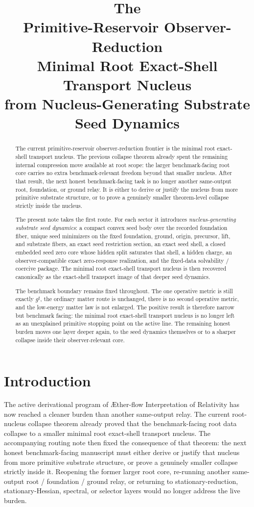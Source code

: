 \documentclass[11pt]{article}
\title{\textbf{The \TheoryName{}}\\[0.4em]
\large Primitive-Reservoir Observer-Reduction\\
\large Minimal Root Exact-Shell Transport Nucleus\\
\large from Nucleus-Generating Substrate Seed Dynamics}
\author{}
\date{}
\newcommand{\Aflow}{\AE{}ther-flow}
\newcommand{\TheoryName}{\Aflow{} Interpretation of Relativity}
\newcommand{\CompletedMetric}{g^{\sharp}}
\begin{document}
\maketitle

\begin{abstract}
The current primitive-reservoir observer-reduction frontier is the minimal root exact-shell transport nucleus. The previous collapse theorem already spent the remaining internal compression move available at root scope: the larger benchmark-facing root core carries no extra benchmark-relevant freedom beyond that smaller nucleus. After that result, the next honest benchmark-facing task is no longer another same-output root, foundation, or ground relay. It is either to derive or justify the nucleus from more primitive substrate structure, or to prove a genuinely smaller theorem-level collapse strictly inside the nucleus.

The present note takes the first route. For each sector it introduces \emph{nucleus-generating substrate seed dynamics}: a compact convex seed body over the recorded foundation fiber, unique seed minimizers on the fixed foundation, ground, origin, precursor, lift, and substrate fibers, an exact seed restriction section, an exact seed shell, a closed embedded seed zero core whose hidden split saturates that shell, a hidden charge, an observer-compatible exact zero-response realization, and the fixed-data solvability / coercive package. The minimal root exact-shell transport nucleus is then recovered canonically as the exact-shell transport image of that deeper seed dynamics.

The benchmark boundary remains fixed throughout. The one operative metric is still exactly \(\CompletedMetric\), the ordinary matter route is unchanged, there is no second operative metric, and the low-energy matter law is not enlarged. The positive result is therefore narrow but benchmark facing: the minimal root exact-shell transport nucleus is no longer left as an unexplained primitive stopping point on the active line. The remaining honest burden moves one layer deeper again, to the seed dynamics themselves or to a sharper collapse inside their observer-relevant core.
\end{abstract}

\section{Introduction}

The active derivational program of \TheoryName{} has now reached a cleaner burden than another same-output relay. The current root-nucleus collapse theorem already proved that the benchmark-facing root data collapse to a smaller minimal root exact-shell transport nucleus. The accompanying routing note then fixed the consequence of that theorem: the next honest benchmark-facing manuscript must either derive or justify that nucleus from more primitive substrate structure, or prove a genuinely smaller collapse strictly inside it. Reopening the former larger root core, re-running another same-output root / foundation / ground relay, or returning to stationary-reduction, stationary-Hessian, spectral, or selector layers would no longer address the live burden.
\end{document}
